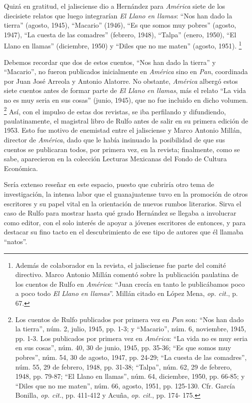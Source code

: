 \documentclass[14pt,twoside,final]{extbook} %
\let\oldfootnote\footnote
\renewcommand\footnote[1]{%
\oldfootnote{\hspace{1mm}#1}}
\begin{document}
Quizá en gratitud, el jalisciense dio a Hernández para \emph{América} siete de los diecisiete relatos que luego integrarían \emph{El Llano en llamas}: ``Nos han dado la tierra'' (agosto, 1945), ``Macario'' (1946), ``Es que somos muy pobres'' (agosto, 1947), ``La cuesta de las comadres'' (febrero, 1948), ``Talpa'' (enero, 1950), ``El Llano en llamas'' (diciembre, 1950) y ``Diles que no me maten'' (agosto, 1951).\footnote{Además de colaborador en la revista, el jalisciense fue parte del comité directivo. Marco Antonio Millán comentó sobre la publicación paulatina de los cuentos de Rulfo en \emph{América}: ``Juan crecía en tanto le publicábamos poco a poco todo \emph{El Llano en llamas}''. Millán citado en López Mena, \emph{op. cit.}, p. 67.}

Debemos recordar que dos de estos cuentos, ``Nos han dado la tierra'' y ``Macario'', no fueron publicados inicialmente en \emph{América} sino en \emph{Pan}, coordinada por Juan José Arreola y Antonio Alatorre. No obstante, \emph{América} albergó estos siete cuentos antes de formar parte de \emph{El Llano en llamas}, más el relato ``La vida no es muy seria en sus cosas'' (junio, 1945), que no fue incluido en dicho volumen.\footnote{Los cuentos de Rulfo publicados por primera vez en \emph{Pan} son: ``Nos han dado la tierra'', núm. 2, julio, 1945, pp. 1-3; y ``Macario'', núm. 6, noviembre, 1945, pp. 1-3. Los publicados por primera vez en \emph{América}: ``La vida no es muy seria en sus cosas'', núm. 40, 30 de junio, 1945, pp. 35-36; ``Es que somos muy pobres'', núm. 54, 30 de agosto, 1947, pp. 24-29; ``La cuesta de las comadres'', núm. 55, 29 de febrero, 1948, pp. 31-38; ``Talpa'', núm. 62, 29 de febrero, 1948, pp. 79-87; ``El Llano en llamas'', núm. 64, diciembre, 1950, pp. 66-85; y ``Diles que no me maten'', núm. 66, agosto, 1951, pp. 125-130. Cfr. García Bonilla, \emph{op. cit.}, pp. 411-412 y Acuña, \emph{op. cit.}, pp. 174- 175.} Así, con el impulso de estas dos revistas, se iba perfilando y difundiendo, paulatinamente, el magistral libro de Rulfo antes de salir en su primera edición de 1953. Esto fue motivo de enemistad entre el jalisciense y Marco Antonio Millán, director de \emph{América}, dado que le había insinuado la posibilidad de que sus cuentos se publicaran todos, por primera vez, en la revista; finalmente, como se sabe, aparecieron en la colección Lecturas Mexicanas del Fondo de Cultura Económica.

Sería extenso reseñar en este espacio, puesto que cubriría otro tema de investigación, la intensa labor que el guanajuatense tuvo en la promoción de otros escritores y su papel vital en la orientación de nuevos rumbos literarios. Sirva el caso de Rulfo para mostrar hasta qué grado Hernández se llegaba a involucrar como editor, con el solo interés de apoyar a jóvenes escritores de entonces, y para destacar su fino tacto en el descubrimiento de ese tipo de autores que él llamaba ``natos''.
\end{document}

